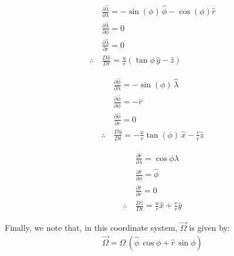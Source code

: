 \vspace{-3mm}
\begin{minipage}{.3\linewidth}
\begin{align*}
    &\frac{\partial \hat{\lambda}}{\partial \lambda}=-\sin(\phi) \, \hat{\phi}-\cos(\phi)\hat{r}
    \\
    &\frac{\partial \hat{\lambda}}{\partial \phi}=0
    \\
    &\frac{\partial \hat{\lambda}}{\partial r}=0
    \\
    \therefore\,
    &
    \boxed{\frac{D\hat{x}}{Dt}=\frac{u}{r}\left( \tan\phi\,\hat{y}-\hat{z} \right)}
\end{align*}
\end{minipage}
\begin{minipage}{.3\linewidth}
\begin{align*}
    &\frac{\partial \hat{\phi}}{\partial \lambda}=-\sin(\phi)\,\hat{\lambda}
    \\
    &\frac{\partial \hat{\phi}}{\partial \phi}=-\hat{r}
    \\
    &\frac{\partial \hat{\phi}}{\partial r}=0
    \\
    \therefore\,
    &
    \boxed{\frac{D\hat{y}}{Dt}=-\frac{u}{r}\tan(\phi)\,\hat{x}-\frac{v}{r}\hat{z}}
\end{align*}
\end{minipage}
\begin{minipage}{.3\linewidth}
\begin{align*}
    &\frac{\partial \hat{r}}{\partial \lambda}=\cos\phi\hat{\lambda}
    \\
    &\frac{\partial \hat{r}}{\partial \phi}=\hat{\phi}
    \\
    &\frac{\partial \hat{r}}{\partial r}=0
    \\
    \therefore\,
    &
    \boxed{\frac{D\hat{z}}{Dt}=\frac{u}{r}\hat{x}+\frac{v}{r}\hat{y}}
\end{align*}
\end{minipage}

\vspace{2mm}Finally, we note that, in this coordinate system, \(\vec{\Omega}\) is given by:
\begin{align*}
    \vec{\Omega} = \Omega \,(\hat{\phi}\,\cos\phi+\hat{r}\,\sin\phi)
\end{align*}

